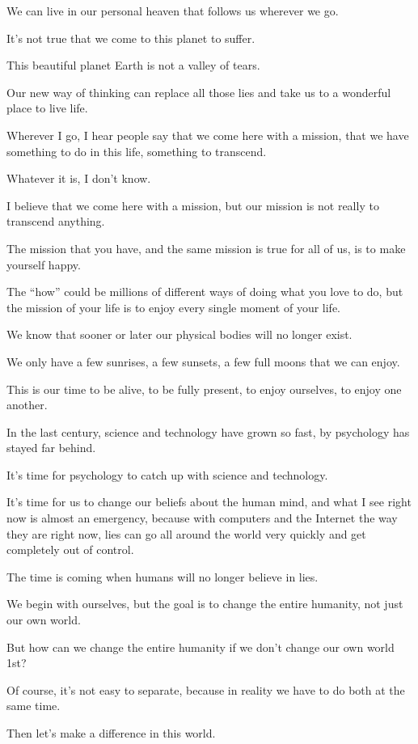 \documentclass{article}
\numberwithin{equation}{section}
\begin{document}
We can live in our personal heaven that follows us wherever we go.

It's not true that we come to this planet to suffer.

This beautiful planet Earth is not a valley of tears.

Our new way of thinking can replace all those lies and take us to a wonderful place to live life.

Wherever I go, I hear people say that we come here with a mission, that we have something to do in this life, something to transcend.

Whatever it is, I don't know.

I believe that we come here with a mission, but our mission is not really to transcend anything.

The mission that you have, and the same mission is true for all of us, is to make yourself happy.

The ``how'' could be millions of different ways of doing what you love to do, but the mission of your life is to enjoy every single moment of your life.

We know that sooner or later our physical bodies will no longer exist.

We only have a few sunrises, a few sunsets, a few full moons that we can enjoy.

This is our time to be alive, to be fully present, to enjoy ourselves, to enjoy one another.

%
In the last century, science and technology have grown so fast, by psychology has stayed far behind.

It's time for psychology to catch up with science and technology.

It's time for us to change our beliefs about the human mind, and what I see right now is almost an emergency, because with computers and the Internet the way they are right now, lies can go all around the world very quickly and get completely out of control.

%
The time is coming when humans will no longer believe in lies.

We begin with ourselves, but the goal is to change the entire humanity, not just our own world.

But how can we change the entire humanity if we don't change our own world 1st?

Of course, it's not easy to separate, because in reality we have to do both at the same time.

%
Then let's make a difference in this world.
\end{document}
